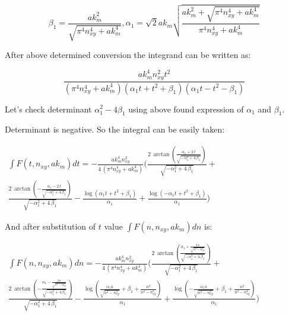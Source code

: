 \documentclass[11pt]{article}
\begin{document}
\[\beta_{1} = \frac{\mathit{ak}_{m}^{2}}{\sqrt{\pi^{4} n_{\mathit{xy}}^{4} + \mathit{ak}_{m}^{4}}}, \alpha_{1} = \sqrt{2} \mathit{ak}_{m} \sqrt{\frac{\mathit{ak}_{m}^{2} + \sqrt{\pi^{4} n_{\mathit{xy}}^{4} + \mathit{ak}_{m}^{4}}}{\pi^{4} n_{\mathit{xy}}^{4} + \mathit{ak}_{m}^{4}}}\]

    After above determined conversion the integrand can be written as:

    \[\frac{\mathit{ak}_{m}^{4} n_{\mathit{xy}}^{2} t^{2}}{{\left(\pi^{4} n_{\mathit{xy}}^{4} + \mathit{ak}_{m}^{4}\right)} {\left(\alpha_{1} t + t^{2} + \beta_{1}\right)} {\left(\alpha_{1} t - t^{2} - \beta_{1}\right)}}\]

    Let's check determinant \(\alpha_1^2 - 4\beta_1\) using above found
expression of \(\alpha_1\) and \(\beta_1\).

    Determinant is negative. So the integral can be easily taken:

    \(\begin{array}{r} \int F\left(t, n_{xy}, ak_m\right) dt = -\frac{\mathit{ak}_{m}^{4} n_{\mathit{xy}}^{2}}{4 \, {\left(\pi^{4} n_{\mathit{xy}}^{4} + \mathit{ak}_{m}^{4}\right)}} \Bigg(\frac{2 \, \arctan\left(\frac{\alpha_{1} + 2 \, t}{\sqrt{-\alpha_{1}^{2} + 4 \, \beta_{1}}}\right)}{\sqrt{-\alpha_{1}^{2} + 4 \, \beta_{1}}} + \\ \frac{2 \, \arctan\left(-\frac{\alpha_{1} - 2 \, t}{\sqrt{-\alpha_{1}^{2} + 4 \, \beta_{1}}}\right)}{\sqrt{-\alpha_{1}^{2} + 4 \, \beta_{1}}} - \frac{\log\left(\alpha_{1} t + t^{2} + \beta_{1}\right)}{\alpha_{1}} + \frac{\log\left(-\alpha_{1} t + t^{2} + \beta_{1}\right)}{\alpha_{1}}\Bigg) \end{array}\)

    And after substitution of \(t\) value
\(\int F\left(n, n_{xy}, ak_m\right) dn\) is:

    \(\begin{array}{r} \int F\left(n, n_{xy}, ak_m\right) dn = -\frac{\mathit{ak}_{m}^{4} n_{\mathit{xy}}^{2}}{4 \, {\left(\pi^{4} n_{\mathit{xy}}^{4} + \mathit{ak}_{m}^{4}\right)}} \Bigg(\frac{2 \, \arctan\left(\frac{\alpha_{1} + \frac{2 \, n}{\sqrt{n^{2} - n_{\mathit{xy}}^{2}}}}{\sqrt{-\alpha_{1}^{2} + 4 \, \beta_{1}}}\right)}{\sqrt{-\alpha_{1}^{2} + 4 \, \beta_{1}}} + \\ \frac{2 \, \arctan\left(-\frac{\alpha_{1} - \frac{2 \, n}{\sqrt{n^{2} - n_{\mathit{xy}}^{2}}}}{\sqrt{-\alpha_{1}^{2} + 4 \, \beta_{1}}}\right)}{\sqrt{-\alpha_{1}^{2} + 4 \, \beta_{1}}} - \frac{\log\left(\frac{\alpha_{1} n}{\sqrt{n^{2} - n_{\mathit{xy}}^{2}}} + \beta_{1} + \frac{n^{2}}{n^{2} - n_{\mathit{xy}}^{2}}\right)}{\alpha_{1}} + \frac{\log\left(-\frac{\alpha_{1} n}{\sqrt{n^{2} - n_{\mathit{xy}}^{2}}} + \beta_{1} + \frac{n^{2}}{n^{2} - n_{\mathit{xy}}^{2}}\right)}{\alpha_{1}}\Bigg) \end{array}\)
\end{document}
